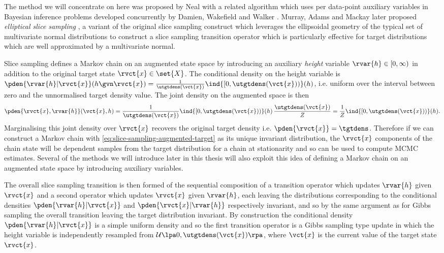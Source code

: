 The method we will concentrate on here was proposed by Neal \citep{neal1997markov,neal2003slice} with a related algorithm which uses per data-point auxiliary variables in Bayesian inference problems developed concurrently by Damien, Wakefield and Walker \citep{damien1999gibbs}. Murray, Adams and Mackay later proposed \emph{elliptical slice sampling} \citep{murray2010elliptical}, a variant of the original slice sampling construct which leverages the ellipsoidal geometry of the typical set of multivariate normal distributions to construct a slice sampling transition operator which is particularly effective for target distributions which are well approximated by a multivariate normal.

Slice sampling defines a Markov chain on an augmented state space by introducing an auxiliary \emph{height} variable $\rvar{h} \in [0, \infty)$ in addition to the original target state $\rvct{x} \in \set{X}$. The conditional density on the height variable is $\pden{\rvar{h}|\rvct{x}}(h\gvn\rvct{x}) = \frac{1}{\utgtdens(\vct{x})} \ind{[0,\utgtdens(\vct{x}))}(h) $, i.e. uniform over the interval between zero and the unnormalised target density value. The joint density on the augmented space is then
\begin{equation}\label{eq:slice-sampling-augmented-target}
  \pden{\rvct{x},\rvar{h}}(\vct{x},h) = 
  \frac{1}{\utgtdens(\vct{x})} \ind{[0,\utgtdens(\vct{x}))}(h)\, \frac{\utgtdens(\vct{x})}{Z} =
  \frac{1}{Z} \ind{[0,\utgtdens(\vct{x}))}(h).
\end{equation}
Marginalising this joint density over $\rvct{x}$ recovers the original target density i.e. $\pden{\rvct{x}} = \tgtdens$. Therefore if we can construct a Markov chain with \eqref{eq:slice-sampling-augmented-target} as its unique invariant distribution, the $\rvct{x}$ components of the chain state will be dependent samples from the target distribution for a chain at stationarity and so can be used to compute \ac{MCMC} estimates. Several of the methods we will introduce later in this thesis will also exploit this idea of defining a Markov chain on an augmented state space by introducing auxiliary variables.

The overall slice sampling transition is then formed of the sequential composition of a transition operator which updates $\rvar{h}$ given $\rvct{x}$ and a second operator which updates $\rvct{x}$ given $\rvar{h}$, each leaving the distributions corresponding to the conditional densities $\pden{\rvar{h}|\rvct{x}}$ and $\pden{\rvct{x}|\rvar{h}}$ respectively invariant, and so by the same argument as for Gibbs sampling the overall transition leaving the target distribution invariant. By construction the conditional density $\pden{\rvar{h}|\rvct{x}}$ is a simple uniform density and so the first transition operator is a Gibbs sampling type update in which the height variable is independently resampled from $\mathcal{U}\lpa 0, \utgtdens(\vct{x})\rpa$, where $\vct{x}$ is the current value of the target state $\rvct{x}$.

